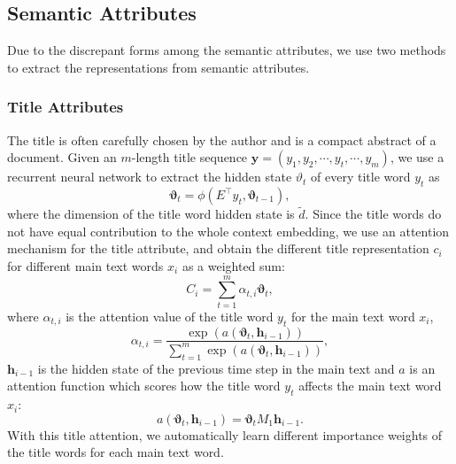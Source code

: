 \documentclass[a4paper]{article}
\begin{document}
%
\subsection{Semantic Attributes}
Due to the discrepant forms among the semantic attributes, we use two methods to extract the representations from semantic attributes.

\subsubsection{Title Attributes}
The title is often carefully chosen by the author and is a compact abstract of a document.
Given an $m$-length title sequence $\mathbf{y}=(y_1,y_2,\cdots,y_{t},\cdots,y_m)$, we use a recurrent neural network to extract the hidden state $\vartheta_t$ of every title word $y_t$ as
\begin{equation}
\mathbf{\vartheta}_{t}=\phi(E^{\top}y_t,\mathbf{\vartheta}_{t-1}),
\end{equation}
where the dimension of the title word hidden state is $\tilde{d}$.
Since the title words do not have equal contribution to the whole context embedding, we use an attention mechanism for the title attribute, and obtain the different title representation $c_{i}$ for different main text words $x_{i}$ as a weighted sum:
\begin{equation}
 C_{i}=\sum_{t=1}^{m}\alpha_{t,i}\mathbf{\vartheta}_{t},
\end{equation}
where $\alpha_{t,i}$ is the attention value of the title word $y_{t}$ for the main text word $x_{i}$,
\begin{equation}
\alpha_{t,i}=\frac{\exp(a(\mathbf{\vartheta}_{t},\mathbf{h}_{i-1}))}{\sum_{t=1}^{m}\exp(a(\mathbf{\vartheta}_{t},\mathbf{h}_{i-1}))},
\end{equation}
$\mathbf{h}_{i-1}$ is the hidden state of the previous time step in the main text and $a$ is an attention function which scores how the title word $y_{t}$ affects the main text word $x_{i}$:
\begin{equation}
a(\mathbf{\vartheta}_{t},\mathbf{h}_{i-1})=\mathbf{\vartheta}_{t}M_{1}\mathbf{h}_{i-1}.
\end{equation}
With this title attention, we automatically learn different importance weights of the title words for each main text word.
\end{document}
